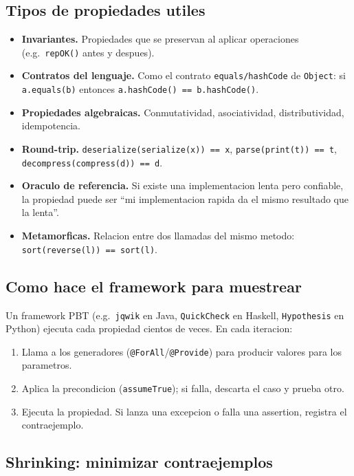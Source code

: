 \documentclass[12pt,a4paper]{article}
\begin{document}
\subsection{Tipos de propiedades utiles}

\begin{itemize}
  \item \textbf{Invariantes.} Propiedades que se preservan al aplicar operaciones (e.g.\
  \texttt{repOK()} antes y despues).
  \item \textbf{Contratos del lenguaje.} Como el contrato \texttt{equals/hashCode} de
  \texttt{Object}: si \texttt{a.equals(b)} entonces \texttt{a.hashCode() == b.hashCode()}.
  \item \textbf{Propiedades algebraicas.} Conmutatividad, asociatividad, distributividad,
  idempotencia.
  \item \textbf{Round-trip.} \texttt{deserialize(serialize(x)) == x}, \texttt{parse(print(t))
  == t}, \texttt{decompress(compress(d)) == d}.
  \item \textbf{Oraculo de referencia.} Si existe una implementacion lenta pero confiable, la
  propiedad puede ser ``mi implementacion rapida da el mismo resultado que la lenta''.
  \item \textbf{Metamorficas.} Relacion entre dos llamadas del mismo metodo:
  \texttt{sort(reverse(l)) == sort(l)}.
\end{itemize}

\subsection{Como hace el framework para muestrear}

Un framework PBT (e.g.\ \texttt{jqwik} en Java, \texttt{QuickCheck} en Haskell,
\texttt{Hypothesis} en Python) ejecuta cada propiedad cientos de veces. En cada iteracion:

\begin{enumerate}
  \item Llama a los generadores (\texttt{@ForAll}/\texttt{@Provide}) para producir valores
  para los parametros.
  \item Aplica la precondicion (\texttt{assumeTrue}); si falla, descarta el caso y prueba
  otro.
  \item Ejecuta la propiedad. Si lanza una excepcion o falla una assertion, registra el
  contraejemplo.
\end{enumerate}

\subsection{Shrinking: minimizar contraejemplos}
\end{document}
